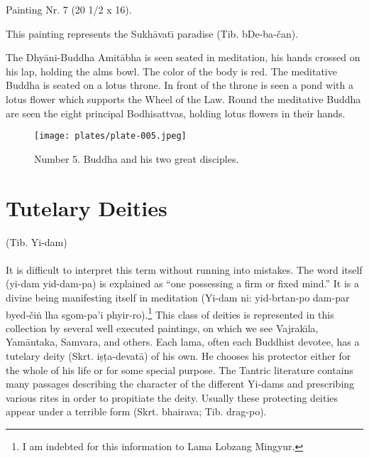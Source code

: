 \documentclass[a4paper, 12pt, oneside]{article}
\begin{document}
Painting Nr. 7 (20 1/2 x 16).

\bigskip

This painting represents the Sukh\={a}vat\={\i} paradise (Tib. bDe-ba-čan).

The Dhy\={a}ni-Buddha Amit\={a}bha is seen seated in meditation, his hands crossed on his lap, holding the alms bowl. The color of the body is red. The meditative Buddha is seated on a lotus throne. In front of the throne is seen a pond with a lotus flower which supports the Wheel of the Law. Round the meditative Buddha are seen the eight principal Bodhisattvas, holding lotus flowers in their hands. 

\clearpage
\begin{figure}[H]
\centering
\texttt{[image: plates/plate-005.jpeg]}
\caption*{Number 5. Buddha and his two great disciples.}
\end{figure}
\clearpage
\section{Tutelary Deities}
\begin{center}
(Tib. Yi-dam)
\end{center}
\paragraph{}
It is difficult to interpret this term without running into mistakes. The word itself (yi-dam yid-dam-pa) is explained as ``one possessing a firm or fixed mind.'' It is a divine being manifesting itself in meditation (Yi-dam ni: yid-brtan-po dam-par byed-či\.{n} lha sgom-pa'i phyir-ro).\footnote{I am indebted for this information to Lama Lobzang Mingyur.} This class of deities is represented in this collection by several well executed paintings, on which we see Vajrak\={\i}la, Yam\={a}ntaka, Samvara, and others. Each lama, often each Buddhist devotee, has a tutelary deity (Skrt. i\d{s}\d{t}a-devat\={a}) of his own. He chooses his protector either for the whole of his life or for some special purpose. The Tantric literature contains many passages describing the character of the different Yi-dams and prescribing various rites in order to propitiate the deity. Usually these protecting deities appear under a terrible form (Skrt. bhairava; Tib. drag-po).
\end{document}
